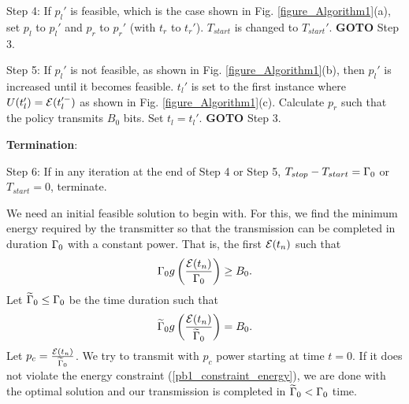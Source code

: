 Step 4: If $p_l'$ is feasible, which is the case shown in Fig. \ref{figure_Algorithm1}(a), set $p_l$ to $p_l'$ and $p_r$ to $p_r'$ (with $t_r$ to $t_r'$). $T_{start}$ is changed to $T_{start}'$. \textbf{GOTO} Step 3. 

Step 5: If $p_l'$ is not feasible, as shown in Fig. \ref{figure_Algorithm1}(b), then $p_l'$ is increased until it becomes feasible. $t_l'$ is set to the first instance where $U(t_l') = \mathcal{E}(t_l'^-)$ as shown in Fig. \ref{figure_Algorithm1}(c). Calculate $p_r$ such that the policy transmits $B_0$ bits. Set $t_l = t_l'$. \textbf{GOTO} Step 3.

\textbf{Termination}:

Step 6: If in any iteration at the end of Step 4 or Step 5, $T_{stop} - T_{start} = \Gamma_0$ or $T_{start} = 0$, terminate.


We need an initial feasible solution to begin with. For this, we find the minimum energy required by the transmitter so that the transmission can be completed in duration $\Gamma_0$ with a constant power. That is, the first $\mathcal{E}(t_n)$ such that
\begin{equation}
\Gamma_0 g\left(\frac{\mathcal{E}(t_n)}{\Gamma_0}\right)\geq B_0.
\end{equation}
Let $\widetilde{\Gamma}_0\le \Gamma_0$ be the time duration such that
\begin{equation}
\widetilde{\Gamma}_0 g\left(\frac{\mathcal{E}(t_n)}{\widetilde{\Gamma}_0}\right)=B_0.
\end{equation}
Let $p_c=\frac{\mathcal{E}(t_n)}{\widetilde{\Gamma}_0}$. We try to transmit with $p_c$ power starting at time $t=0$. If it does not violate the energy constraint (\ref{pb1_constraint_energy}), we are done with the optimal solution and our transmission is completed in $\widetilde{\Gamma}_0<\Gamma_0$ time.

